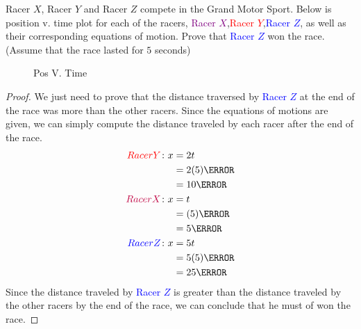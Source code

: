 \documentclass[12pt]{article} %
\begin{document}
\begin{qstn}[4]
    Racer $X$, Racer $Y$ and Racer $Z$ compete in the Grand Motor Sport. Below is position v. time plot for each of the racers, \textcolor{purple}{Racer $X$},\textcolor{red}{Racer $Y$},\textcolor{blue}{Racer $Z$}, as well as their corresponding equations of motion. Prove that \textcolor{blue}{Racer $Z$} won the race. (Assume that the race lasted for $5$ seconds)
    \begin{figure}[h]
        \centering
        \caption{Pos V. Time}
        \label{fig:my-awesome-graph}
    \end{figure}

    \begin{soln}
        \begin{proof}
            We just need to prove that the distance traversed by \textcolor{blue}{Racer $Z$} at the end of the race was more than the other racers. Since the equations of motions are given, we can simply compute the distance traveled by each racer after the end of the race. 
            \begin{align*}
                \textcolor{red}{Racer Y} \colon x &= 2t \\
                &= 2(5) \m\\
                &= 10\m\\
                \textcolor{purple}{Racer X} \colon x &= t \\
                &= (5) \m \\
                &= 5\m \\
                \textcolor{blue}{Racer Z} \colon x &= 5t\\
                &= 5(5) \m \\
                &= 25 \m
            \end{align*}
            Since the distance traveled by \textcolor{blue}{Racer $Z$} is greater than the distance traveled by the other racers by the end of the race, we can conclude that he must of won the race.
        \end{proof}



\end{soln}
\end{qstn}
\end{document}
